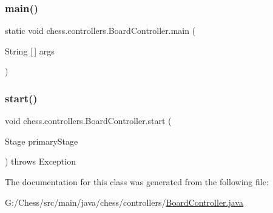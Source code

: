 \subsubsection{\texorpdfstring{main()}{main()}}
{\footnotesize\ttfamily static void chess.\+controllers.\+Board\+Controller.\+main (\begin{DoxyParamCaption}\item[{String \mbox{[}$\,$\mbox{]}}]{args }\end{DoxyParamCaption})\hspace{0.3cm}{\ttfamily [static]}}

\mbox{\label{classchess_1_1controllers_1_1_board_controller_abd589cb5a8d0808c83932ffba970c747}} 
\subsubsection{\texorpdfstring{start()}{start()}}
{\footnotesize\ttfamily void chess.\+controllers.\+Board\+Controller.\+start (\begin{DoxyParamCaption}\item[{Stage}]{primary\+Stage }\end{DoxyParamCaption}) throws Exception}



The documentation for this class was generated from the following file\+:\begin{DoxyCompactItemize}
\item 
G\+:/\+Chess/src/main/java/chess/controllers/\mbox{\hyperlink{_board_controller_8java}{Board\+Controller.\+java}}\end{DoxyCompactItemize}
